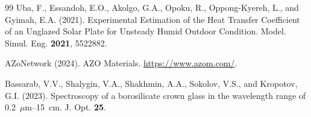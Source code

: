 \documentclass[11pt]{article}
\begin{document}
\begin{thebibliography}{99}
 Uba, F., Essandoh, E.O., Akolgo, G.A., Opoku, R., Oppong-Kyereh, L., and Gyimah, E.A. (2021). Experimental Estimation of the Heat Transfer Coefficient of an Unglazed Solar Plate for Unsteady Humid Outdoor Condition. Model. Simul. Eng. \textbf{2021}, 5522882.

 AZoNetwork (2024). AZO Materials. \url{https://www.azom.com/}.

 Bassarab, V.V., Shalygin, V.A., Shakhmin, A.A., Sokolov, V.S., and Kropotov, G.I. (2023). Spectroscopy of a borosilicate crown glass in the wavelength range of 0.2~$\mu$m--15~cm. J. Opt. \textbf{25}.

\end{thebibliography}
\end{document}

